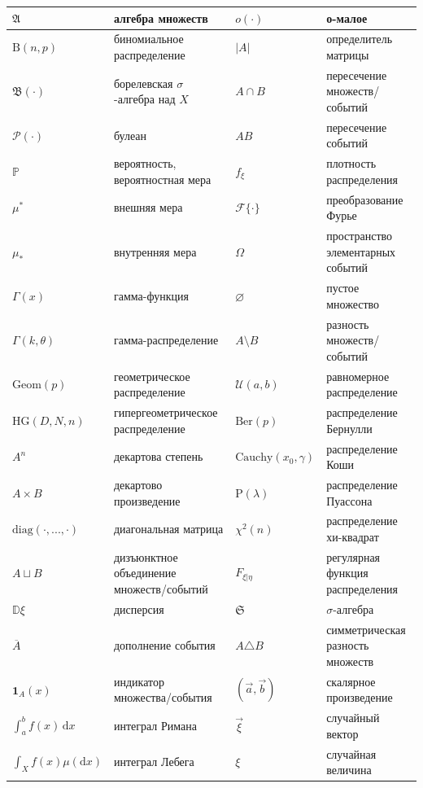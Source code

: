 \begin{longtable}{|p{3cm}|p{4cm}|p{3cm}|p{4cm}|}
$\mathfrak{A}$ & алгебра множеств & $o(\cdot)$ & о-малое \\
\hline
$\mathrm{B}(n, p)$ & биномиальное распределение & $|A|$ & определитель матрицы \\
\hline
$\mathfrak{B}(\cdot)$ & борелевская $\sigma$-алгебра над $X$ & $A \cap B$ & пересечение множеств/событий \\
\hline
$\mathcal{P}(\cdot)$ & булеан & $AB$ & пересечение событий \\
\hline
$\mathbb{P}$ & вероятность, вероятностная мера & $f_{\xi}$ & плотность распределения \\
\hline
$\mu^*$ & внешняя мера & $\mathcal{F}\{\cdot\}$ & преобразование Фурье \\
\hline
$\mu_*$ & внутренняя мера & $\Omega$ & пространство элементарных событий \\
\hline
$\Gamma(x)$ & гамма-функция & $\varnothing$ & пустое множество \\
\hline
$\Gamma(k, \theta)$ & гамма-распределение & $A \setminus B$ & разность множеств/событий \\
\hline
$\mathrm{Geom}(p)$ & геометрическое распределение & $\mathcal{U}(a, b)$ & равномерное распределение \\
\hline
$\mathrm{HG}(D, N, n)$ & гипергеометрическое распределение & $\mathrm{Ber}(p)$ & распределение Бернулли \\
\hline
$A^n$ & декартова степень & $\mathrm{Cauchy}(x_0, \gamma)$ & распределение Коши \\
\hline
$A \times B$ & декартово произведение & $\mathrm{P}(\lambda)$ & распределение Пуассона \\
\hline
$\mathrm{diag}(\cdot, ..., \cdot)$ & диагональная матрица & $\chi^2(n)$ & распределение хи-квадрат \\
\hline
$A \sqcup B$ & дизъюнктное объединение множеств/событий & $F_{\xi|\eta}$ & регулярная функция распределения \\
\hline
$\mathbb{D}\xi$ & дисперсия & $\mathfrak{S}$ & $\sigma$-алгебра \\
\hline
$\overline{A}$ & дополнение события & $A \triangle B$ & симметрическая разность множеств \\
\hline
$\mathbf{1}_A(x)$ & индикатор множества/события & $(\vec{a}, \vec{b})$ & скалярное произведение \\
\hline
$\int_a^b f(x)\,\mathrm{d}x$ & интеграл Римана & $\vec{\xi}$ & случайный вектор \\
\hline
$\int_X f(x) \mu(\mathrm{d}x)$ & интеграл Лебега & $\xi$ & случайная величина \\

\end{longtable}
